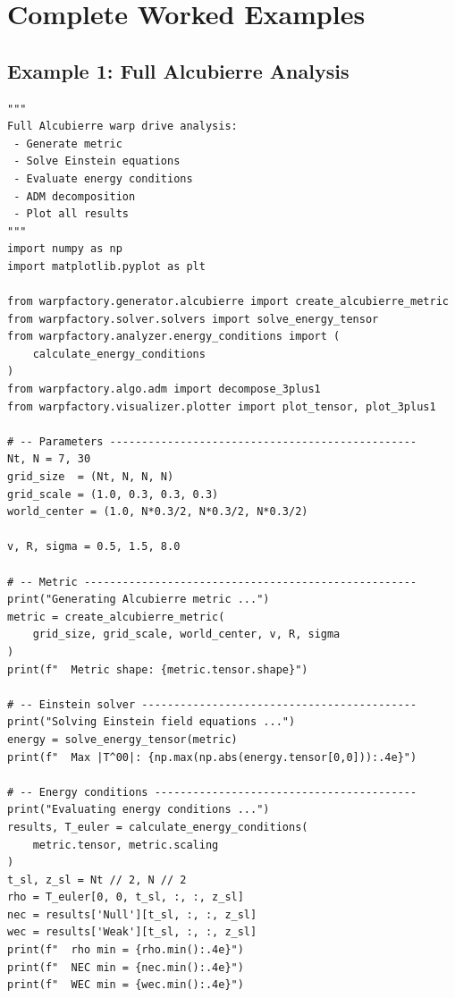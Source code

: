 \documentclass[11pt, a4paper, twoside]{report}
\begin{document}
\chapter{Complete Worked Examples}
\label{chap:examples}

\section{Example 1: Full Alcubierre Analysis}

\begin{lstlisting}[caption={Complete Alcubierre analysis script}]
"""
Full Alcubierre warp drive analysis:
 - Generate metric
 - Solve Einstein equations
 - Evaluate energy conditions
 - ADM decomposition
 - Plot all results
"""
import numpy as np
import matplotlib.pyplot as plt

from warpfactory.generator.alcubierre import create_alcubierre_metric
from warpfactory.solver.solvers import solve_energy_tensor
from warpfactory.analyzer.energy_conditions import (
    calculate_energy_conditions
)
from warpfactory.algo.adm import decompose_3plus1
from warpfactory.visualizer.plotter import plot_tensor, plot_3plus1

# -- Parameters ------------------------------------------------
Nt, N = 7, 30
grid_size  = (Nt, N, N, N)
grid_scale = (1.0, 0.3, 0.3, 0.3)
world_center = (1.0, N*0.3/2, N*0.3/2, N*0.3/2)

v, R, sigma = 0.5, 1.5, 8.0

# -- Metric ----------------------------------------------------
print("Generating Alcubierre metric ...")
metric = create_alcubierre_metric(
    grid_size, grid_scale, world_center, v, R, sigma
)
print(f"  Metric shape: {metric.tensor.shape}")

# -- Einstein solver -------------------------------------------
print("Solving Einstein field equations ...")
energy = solve_energy_tensor(metric)
print(f"  Max |T^00|: {np.max(np.abs(energy.tensor[0,0])):.4e}")

# -- Energy conditions -----------------------------------------
print("Evaluating energy conditions ...")
results, T_euler = calculate_energy_conditions(
    metric.tensor, metric.scaling
)
t_sl, z_sl = Nt // 2, N // 2
rho = T_euler[0, 0, t_sl, :, :, z_sl]
nec = results['Null'][t_sl, :, :, z_sl]
wec = results['Weak'][t_sl, :, :, z_sl]
print(f"  rho min = {rho.min():.4e}")
print(f"  NEC min = {nec.min():.4e}")
print(f"  WEC min = {wec.min():.4e}")


\end{lstlisting}
\end{document}
